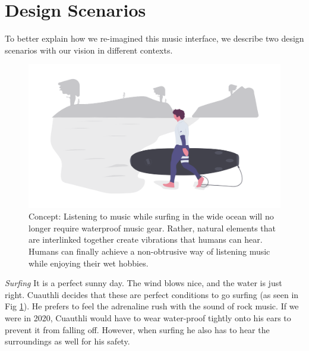 \documentclass[sigchi]{acmart}
\begin{document}
\section{Design Scenarios}
To better explain how we re-imagined this music interface, we describe two design scenarios with our vision in different contexts.
\begin{figure}[h]
  \centering
  \includegraphics[width=\linewidth]{acmart-master-2/samples/surfbnw.png}
  \caption{Concept: Listening to music while surfing in the wide ocean will no longer require waterproof music gear. Rather, natural elements that are interlinked together create vibrations that humans can hear. Humans can finally achieve a non-obtrusive way of listening music while enjoying their wet hobbies. }
  \label{fig: surf}
\end{figure}
\textit{Surfing}
It is a perfect sunny day. The wind blows nice, and the water is just right. Cuauthli decides that these are perfect conditions to go surfing (as seen in Fig \ref{fig: surf}). He prefers to feel the adrenaline rush with the sound of rock music. If we were in 2020, Cuauthli would have to wear water-proof tightly onto his ears to prevent it from falling off. However, when surfing he also has to hear the surroundings as well for his safety. 
\end{document}
